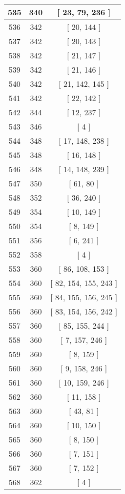 \begin{center}
\begin{longtable}[H]{|| c c c ||}
\hline
535 & 340 & [ 23, 79, 236 ] \\ 
\hline
536 & 342 & [ 20, 144 ] \\ 
\hline
537 & 342 & [ 20, 143 ] \\ 
\hline
538 & 342 & [ 21, 147 ] \\ 
\hline
539 & 342 & [ 21, 146 ] \\ 
\hline
540 & 342 & [ 21, 142, 145 ] \\ 
\hline
541 & 342 & [ 22, 142 ] \\ 
\hline
542 & 344 & [ 12, 237 ] \\ 
\hline
543 & 346 & [ 4 ] \\ 
\hline
544 & 348 & [ 17, 148, 238 ] \\ 
\hline
545 & 348 & [ 16, 148 ] \\ 
\hline
546 & 348 & [ 14, 148, 239 ] \\ 
\hline
547 & 350 & [ 61, 80 ] \\ 
\hline
548 & 352 & [ 36, 240 ] \\ 
\hline
549 & 354 & [ 10, 149 ] \\ 
\hline
550 & 354 & [ 8, 149 ] \\ 
\hline
551 & 356 & [ 6, 241 ] \\ 
\hline
552 & 358 & [ 4 ] \\ 
\hline
553 & 360 & [ 86, 108, 153 ] \\ 
\hline
554 & 360 & [ 82, 154, 155, 243 ] \\ 
\hline
555 & 360 & [ 84, 155, 156, 245 ] \\ 
\hline
556 & 360 & [ 83, 154, 156, 242 ] \\ 
\hline
557 & 360 & [ 85, 155, 244 ] \\ 
\hline
558 & 360 & [ 7, 157, 246 ] \\ 
\hline
559 & 360 & [ 8, 159 ] \\ 
\hline
560 & 360 & [ 9, 158, 246 ] \\ 
\hline
561 & 360 & [ 10, 159, 246 ] \\ 
\hline
562 & 360 & [ 11, 158 ] \\ 
\hline
563 & 360 & [ 43, 81 ] \\ 
\hline
564 & 360 & [ 10, 150 ] \\ 
\hline
565 & 360 & [ 8, 150 ] \\ 
\hline
566 & 360 & [ 7, 151 ] \\ 
\hline
567 & 360 & [ 7, 152 ] \\ 
\hline
568 & 362 & [ 4 ] \\ 
\hline

\end{longtable}
\end{center}
